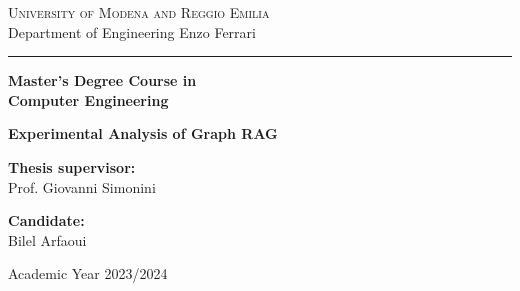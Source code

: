 \begin{titlepage}

\begin{center}
{\scshape \Large
University of Modena and Reggio Emilia\\
}
\vspace{5mm}
{\Large
Department of Engineering Enzo Ferrari
}

\rule{145mm}{0.1mm}

\vspace{6mm}
\begin{spacing}{1.8}
{\large\textbf{
Master's Degree Course in\\
}}
{\large\textbf{
Computer Engineering
}}
\end{spacing}
\vspace{30mm}

\begin{spacing}{2.0}
{\Large \bf  Experimental Analysis of Graph RAG}\\
\end{spacing}

\end{center}


\vspace{32mm}
\noindent
\begin{minipage}[t]{0.5\textwidth}
\large
\textbf{Thesis supervisor:
}\\
Prof. Giovanni Simonini\\
 \vspace{5mm}

\end{minipage}
\hfill
\begin{minipage}[t]{0.5\textwidth}\raggedleft
\large
\textbf{Candidate:}\\
Bilel Arfaoui\\

\end{minipage}

\vfill

\begin{center}
\large Academic Year 2023/2024
\end{center}



\end{titlepage}
\restoregeometry